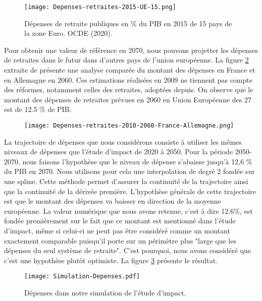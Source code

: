 \documentclass[10pt]{article}
\begin{document}
\begin{figure}
\begin{center}
\texttt{[image: Depenses-retraites-2015-UE-15.png]}
\end{center}
\caption{Dépenses de retraite publiques en \% du PIB en 2015 de 15 pays de la zone Euro. 
OCDE (2020). }
\label{fig-depenses-UE-15-2020}
\end{figure}

Pour obtenir une valeur de référence en 2070, nous pouvons projetter les dépenses de 
retraites dans le futur dans d'autres pays de l'union européenne.  
La figure \ref{fig-depenses-France-Allemagne} extraite 
de \cite{ProspectiveSenat} présente une analyse 
comparée du montant des dépenses en France et en Allemagne en 2060. 
Ces estimations réalisées en 2009 ne tiennent pas compte des réformes, 
notamment celles des retraites, adoptées depuis. 
On observe que le montant des dépenses de retraites prévues en 2060 
en Union Européenne des 27 est de 12.5 \% de PIB.

\begin{figure}
\begin{center}
\texttt{[image: Depenses-retraites-2010-2060-France-Allemagne.png]}
\end{center}
\caption{}
\label{fig-depenses-France-Allemagne}
\end{figure}

La trajectoire de dépenses que nous considérons consiste à utiliser les mêmes 
niveaux de dépenses que l'étude d'impact de 2020 à 2050. 
Pour la période 2050-2070, nous faisons l'hypothèse que le niveau 
de dépense s'abaisse jusqu'à 12,6 \% du PIB en 2070. 
Nous utilisons pour cela une interpolation de degré 2 fondée sur une spline. 
Cette méthode permet d'assurer la continuité de la trajectoire ainsi que la continuité 
de la dérivée première. 
L'hypothèse générale de cette trajectoire est que le montant des dépenses 
va baisser en direction de la moyenne européenne. 
La valeur numérique que nous avons retenue, c'est à dire 12.6\%, est fondée premièrement 
sur le fait que ce montant est mentionné dans l'étude d'impact, même si celui-ci ne peut pas 
être considéré comme un montant exactement comparable puisqu'il porte 
sur un périmètre plus "large que les dépenses du seul système de retraite". 
C'est pourquoi, nous avons considéré que c'est une hypothèse plutôt optimiste. 
La figure \ref{fig-dépenses-simulation} présente le résultat. 

\begin{figure}
\begin{center}
\texttt{[image: Simulation-Depenses.pdf]}
\end{center}
\caption{Dépenses dans notre simulation de l'étude d'impact.}
\label{fig-dépenses-simulation}
\end{figure}
\end{document}
